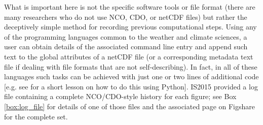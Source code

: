 What is important here is not the specific software tools or file format (there are many researchers who do not use NCO, CDO, or netCDF files) but rather the deceptively simple method for recording previous computational steps. Using any of the programming languages common to the weather and climate sciences, a user can obtain details of the associated command line entry and append such text to the global attributes of a netCDF file (or a corresponding metadata text file if dealing with file formats that are not self-describing). In fact, in all of these languages such tasks can be achieved with just one or two lines of additional code [e.g. see \citet{Irving2015a} for a short lesson on how to do this using Python]. IS2015 provided a log file containing a complete NCO/CDO-style history for each figure; see Box \ref{box:log_file} for details of one of those files and the associated page on Figshare for the complete set.

